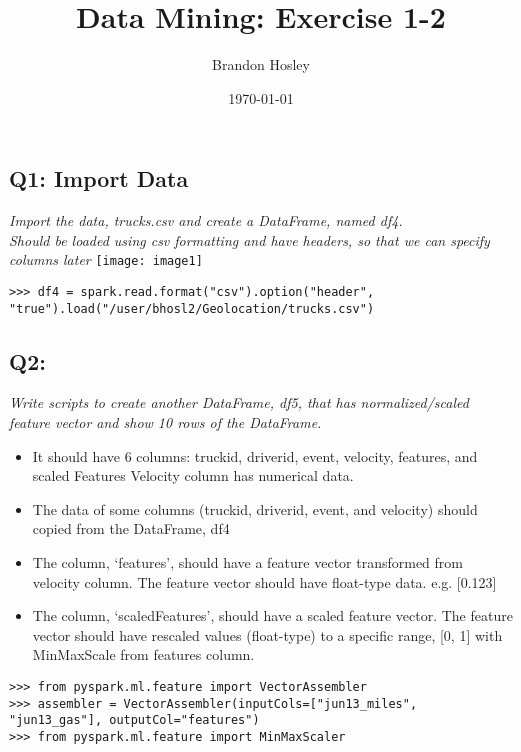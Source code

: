 \documentclass[]{article}
\title{Data Mining: Exercise 1-2}
\author{Brandon Hosley}
\date{\today}
\begin{document}
\maketitle

\subsection*{Q1: Import Data}
\emph{Import the data, trucks.csv and create a DataFrame, named df4. \\
	Should be loaded using csv formatting and have headers, so that we can specify columns later}
	\texttt{[image: image1]}
\begin{verbatim}
>>> df4 = spark.read.format("csv").option("header", "true").load("/user/bhosl2/Geolocation/trucks.csv")
\end{verbatim}

\subsection*{Q2: }
\emph{Write scripts to create another DataFrame, df5, 
	that has normalized/scaled feature vector and
	show 10 rows of the DataFrame.}
	\begin{itemize}[before=\itshape,font=\normalfont]
		\item It should have 6 columns: truckid, driverid, event, velocity, features, and scaled Features Velocity column has numerical data.
		\item The data of some columns (truckid, driverid, event, and velocity) should copied from the DataFrame, df4
		\item The column, ‘features’, should have a feature vector transformed from velocity column. The feature vector should have float-type data. e.g. [0.123]
		\item The column, ‘scaledFeatures’, should have a scaled feature vector. The feature vector should have rescaled values (float-type) to a specific range, [0, 1] with MinMaxScale from features column.
	\end{itemize} 

\begin{verbatim}
>>> from pyspark.ml.feature import VectorAssembler
>>> assembler = VectorAssembler(inputCols=["jun13_miles", "jun13_gas"], outputCol="features")
>>> from pyspark.ml.feature import MinMaxScaler
\end{verbatim}
\end{document}

